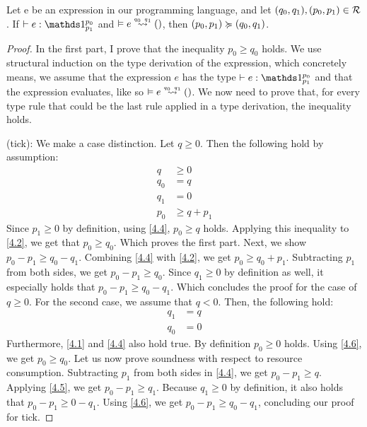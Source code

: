 \begin{theorem}
   Let e be an expression in our programming language, and let \((q_0, q_1), (p_0, p_1) \in \mathcal{R}\). 
   \center If \(\typing{}{e}{\ratype{\unit}{p_0}{p_1}}\) and \(\evals{}{e}{()}{q_0}{q_1}\), then \((p_0, p_1) \succcurlyeq (q_0, q_1)\).
\end{theorem}

\begin{proof}
In the first part, I prove that the inequality \(p_0 \geq q_0\) holds. We use structural induction on the type derivation of the expression, which concretely means, we assume that the expression \(e\) has the type \(\typing{}{e}{\ratype{\unit}{p_0}{p_1}}\) and that the expression evaluates, like so \(\evals{}{e}{()}{q_0}{q_1}\). We now need to prove that, for every type rule that could be the last rule applied in a type derivation, the inequality holds.

   (tick): We make a case distinction. Let \(q \geq 0\). Then the following hold by assumption:
   \begin{align}
      q     &\geq 0 \label{4.1}\\
      q_0   &= q \label{4.2}\\
      q_1   &= 0 \label{4.3}\\
      p_0   &\geq q + p_1 \label{4.4}
   \end{align}
   Since \(p_1 \geq 0\) by definition, using \ref{4.4}, \(p_0 \geq q\) holds. Applying this inequality to \ref{4.2}, we get that \(p_0 \geq q_0\). Which proves the first part.
   Next, we show \(p_0 - p_1 \geq q_0 - q_1\). Combining \ref{4.4} with \ref{4.2}, we get \(p_0 \geq q_0 + p_1\). Subtracting \(p_1\) from both sides, we get \(p_0 - p_1 \geq q_0\). Since \(q_1 \geq 0\) by definition as well, it especially holds that \(p_0 - p_1 \geq q_0 - q_1\). Which concludes the proof for the case of \(q \geq 0\).
   For the second case, we assume that \(q < 0\). Then, the following hold:
   \begin{align}
      q_1   &= q \label{4.5}\\
      q_0   &= 0 \label{4.6}
   \end{align}
   Furthermore, \ref{4.1} and \ref{4.4} also hold true. By definition \(p_0 \geq 0\) holds. Using \ref{4.6}, we get \(p_0 \geq q_0\). 
   Let us now prove soundness with respect to resource consumption. Subtracting \(p_1\) from both sides in \ref{4.4}, we get \(p_0 - p_1 \geq q \). Applying \cref{4.5}, we get \(p_0 - p_1 \geq q_1\). Because \(q_1 \geq 0\) by definition, it also holds that \(p_0 - p_1 \geq 0 - q_1\). Using \ref{4.6}, we get \(p_0 - p_1 \geq q_0 - q_1\), concluding our proof for tick.


\end{proof}
